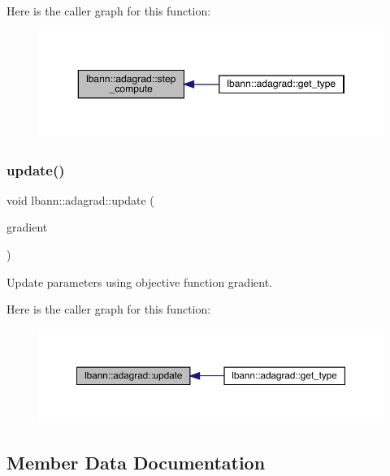 Here is the caller graph for this function\+:\nopagebreak
\begin{figure}[H]
\begin{center}
\leavevmode
\includegraphics[width=350pt]{classlbann_1_1adagrad_a99dbaed2a331ce8d13a73e7beb7f5aba_icgraph}
\end{center}
\end{figure}
\mbox{\label{classlbann_1_1adagrad_a2189fad7d43175458d613bd078ff2b78}} 
\subsubsection{\texorpdfstring{update()}{update()}}
{\footnotesize\ttfamily void lbann\+::adagrad\+::update (\begin{DoxyParamCaption}\item[{const \hyperlink{base_8hpp_a9a697a504ae84010e7439ffec862b470}{Abs\+Dist\+Mat} $\ast$}]{gradient }\end{DoxyParamCaption})}



Update parameters using objective function gradient. 

Here is the caller graph for this function\+:\nopagebreak
\begin{figure}[H]
\begin{center}
\leavevmode
\includegraphics[width=350pt]{classlbann_1_1adagrad_a2189fad7d43175458d613bd078ff2b78_icgraph}
\end{center}
\end{figure}


\subsection{Member Data Documentation}
\mbox{\label{classlbann_1_1adagrad_a5eaf0d220d2be78d91455ba85eef3e9a}} 
